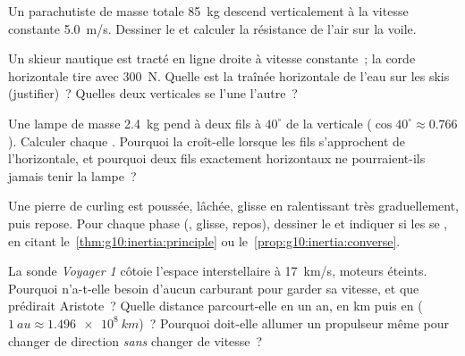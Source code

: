 \begin{exercise}[$\star\star$]\label{exo:g10:inertia:10}
Un parachutiste de masse totale \qty{85}{kg} descend
verticalement à la vitesse constante \qty{5.0}{m/s}. Dessiner
le  et calculer la résistance de l'air
sur la voile.
\end{exercise}

\begin{exercise}[$\star\star$]\label{exo:g10:inertia:11}
Un skieur nautique est tracté en ligne droite à vitesse constante~; la
corde horizontale tire avec \qty{300}{N}. Quelle est la traînée
horizontale de l'eau sur les skis (justifier)~? Quelles deux
 verticales se  l'une l'autre~?
\end{exercise}

\begin{exercise}[$\star\star\star$]\label{exo:g10:inertia:12}
Une lampe de masse \qty{2.4}{kg} pend à deux fils à $40^\circ$ de la
verticale ($\cos 40^\circ \approx 0.766$). Calculer chaque
. Pourquoi la  croît-elle lorsque
les fils s'approchent de l'horizontale, et pourquoi deux fils
exactement horizontaux ne pourraient-ils jamais tenir la lampe~?
\end{exercise}

\begin{exercise}[$\star\star\star$]\label{exo:g10:inertia:13}
Une pierre de curling est poussée, lâchée, glisse en ralentissant très
graduellement, puis repose. Pour chaque phase (, glisse,
repos), dessiner le  et indiquer si les
 se , en citant
le~\cref{thm:g10:inertia:principle} ou
le~\cref{prop:g10:inertia:converse}.
\end{exercise}

\begin{exercise}[$\star\star\star$]\label{exo:g10:inertia:14}
La sonde \emph{Voyager 1} côtoie l'espace interstellaire à
\qty{17}{km/s}, moteurs éteints. Pourquoi n'a-t-elle besoin d'aucun
carburant pour garder sa vitesse, et que prédirait Aristote~?
Quelle distance parcourt-elle en un an, en \unit{km} puis en
 ($\qty{1}{au} \approx
\qty{1.496e8}{km}$)~? Pourquoi doit-elle allumer un propulseur même
pour changer de direction \emph{sans} changer de vitesse~?
\end{exercise}

